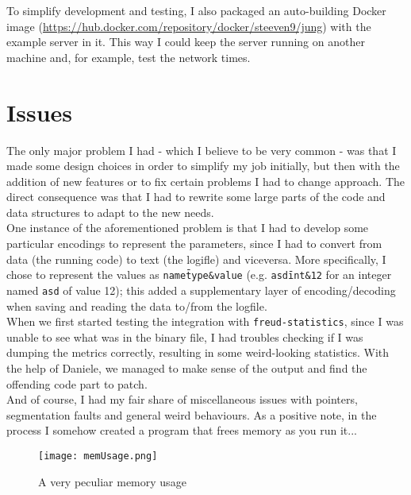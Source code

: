         To simplify development and testing, I also packaged an auto-building Docker image 
        (\url{https://hub.docker.com/repository/docker/steeven9/jung}) with the example server in it.
        This way I could keep the server running on another machine and, for example, test the network times.


    \section{Issues}

        The only major problem I had - which I believe to be very common - was that I made some
        design choices in order to simplify my job initially, but then with the addition of
        new features or to fix certain problems I had to change approach. The direct consequence was that I
        had to rewrite some large parts of the code and data structures to adapt to the new needs.\\
        
        One instance of the aforementioned problem is that I had to develop some particular encodings
        to represent the parameters, since I had to convert from data (the running code) to text
        (the logifle) and viceversa. More specifically, I chose to represent the values as 
        \texttt{name\=type\&value} (e.g. \texttt{asd\=int\&12} for an integer named \texttt{asd} of value 12);
        this added a supplementary layer of encoding/decoding when saving and reading the data to/from the
        logfile.\\        

        When we first started testing the integration with \texttt{freud-statistics}, since I was unable
        to see what was in the binary file, I had troubles checking if I was dumping the metrics correctly,
        resulting in some weird-looking statistics. With the help of Daniele, we managed to make sense of
        the output and find the offending code part to patch.\\

        And of course, I had my fair share of miscellaneous issues with pointers, segmentation faults and 
        general weird behaviours. As a positive note, in the process I somehow created a program that frees
        memory as you run it...

        \begin{figure}[H]
            \centering
            \texttt{[image: memUsage.png]}
            \caption{A very peculiar memory usage}
            \label{fig:memUsage}
        \end{figure}

